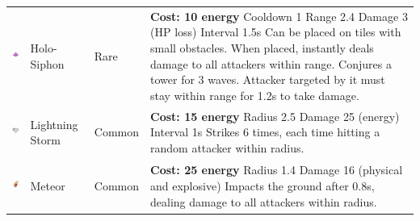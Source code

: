 \begin{table}[H]
\begin{tabular}{m{15mm}m{20mm}lm{}}
        \includegraphics[height=15mm]{img/Icons/Abilities/HoloSiphon.png}      & Holo-Siphon     & Rare            &
        \footnotesize{\textbf{Cost: 10 energy} \newline Cooldown 1 \newline Range 2.4 \newline Damage 3 (HP loss) \newline Interval 1.5s \newline Can be placed on tiles with small obstacles. \newline When placed, instantly deals damage to all attackers within range. \newline Conjures a tower for 3 waves. Attacker targeted by it must stay within range for 1.2s to take damage.} \\

        \includegraphics[height=15mm]{img/Icons/Abilities/Lightning Storm.png} & Lightning Storm & Common          &
        \footnotesize{\textbf{Cost: 15 energy} \newline Radius 2.5 \newline Damage 25 (energy) \newline Interval 1s \newline Strikes 6 times, each time hitting a random attacker within radius.}                                                                                                                                                                                          \\

        \includegraphics[height=15mm]{img/Icons/Abilities/Meteor.png}          & Meteor          & Common          &
        \footnotesize{\textbf{Cost: 25 energy} \newline Radius 1.4 \newline Damage 16 (physical and explosive) \newline Impacts the ground after 0.8s, dealing damage to all attackers within radius.}                                                                                                                                                                                     \\


\end{tabular}
\end{table}
